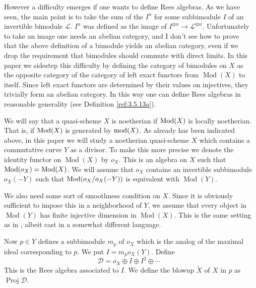 \documentclass{amsproc}
\def\Dscr{{\mathcal D}}
\def\Lscr{{\mathcal L}}
\def\Mod{\mathop{\text{Mod}}}
\def\mod{\mathop{\text{mod}}}
\def\Proj{\operatorname {Proj}}
\def\Qch{\operatorname {Mod}}
\def\r{\rightarrow}
\let\oldtext\text
\def\text#1{\oldtext{\upshape #1}}
\theoremstyle{definition}
\theoremstyle{remark}
\numberwithin{equation}{section}
\numberwithin{table}{section}
\numberwithin{figure}{section}
\begin{document}
However a difficulty emerges if one wants to define Rees algebras.  As
we have seen, the main point is to take the sum of the $I^n$ for some
subbimodule $I$ of an invertible bimodule $\Lscr$. $I^n$ was defined
as the image of $I^{\otimes n}\r \Lscr^{\otimes n}$. Unfortunately to
take an image one needs an abelian category, and I don't see how to
prove that the above definition of a bimodule yields an abelian
category, even if we drop the requirement that bimodules should
commute with direct limits.  In this paper we sidestep this difficulty
by defining the category of bimodules on $X$ as the opposite category
of the category of left exact functors from $\Qch(X)$ to itself. Since
left exact functors are determined by their values on injectives, they
trivially form an abelian category. In this way one can define
Rees algebras in reasonable generality (see Definition
\ref{ref:3.5.13a}).

We will say that a quasi-scheme $X$ is noetherian if $\Mod(X)$ is
locally noetherian. That is, if $\Mod(X)$ is generated by $\mod(X)$.
As already has been indicated above, in this paper we will study a
noetherian quasi-scheme $X$ which contains a commutative curve $Y$
as a divisor.  To make this more precise we denote the identity functor
on $\Qch(X)$ by $o_X$. This is an algebra on $X$ such that
$\Mod(o_X)=\Qch(X)$.  We will assume that $o_X$ contains an invertible
subbimodule $o_X(-Y)$ such that $\Mod(o_X/o_X(-Y))$ is equivalent with
$\Qch(Y)$.

We also need some sort of smoothness condition on $X$. Since it is
obviously sufficient to impose this in a neighborhood of $Y$, we assume
that every object in $\Qch(Y)$ has finite injective dimension in
$\Qch(X)$.
This is the same setting as in \cite{VdBVG}, albeit cast in a
somewhat different language.

Now $p\in Y$ defines a subbimodule $m_p$ of $o_X$ which is the analog
of the maximal ideal corresponding to $p$. We put
$I=m_po_X(Y)$. Define
\[
 \Dscr=o_X\oplus I\oplus I^2\oplus \cdots
 \]
 This is the Rees algebra associated to $I$. We  define the
 blowup $\tilde{X}$ of $X$ in $p$ as $\Proj \Dscr$.
\end{document}
